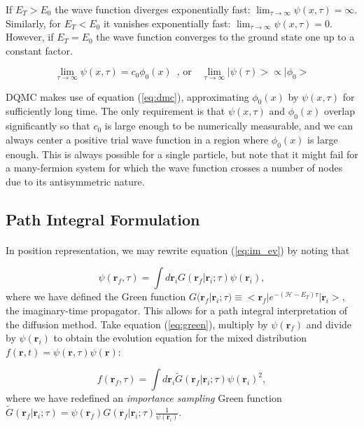 \documentclass[10pt, twocolumn, twoside]{article}
\begin{document}
If $E_T > E_0$ the wave function diverges exponentially fast: $\lim_{\tau \rightarrow \infty} \psi ( x, \tau) = \infty$. Similarly, for $E_T < E_0$ it vanishes exponentially fast: $
\lim_{\tau \rightarrow \infty} \psi ( x, \tau) = 0$. However, if $E_T = E_0$ the wave function converges to the ground state one up to a constant factor.

\begin{equation}\label{eq:dmc}
\lim_{\tau \rightarrow \infty} \psi ( x, \tau) = c_0 \phi_0 (x) \,\,\, \text{, or} \quad \lim_{\tau \rightarrow \infty} |\psi (\tau) > \propto | \phi_0 >
\end{equation}

DQMC makes use of equation (\ref{eq:dmc}), approximating $\phi_0(x)$ by $\psi (x, \tau)$ for sufficiently long time. The only requirement is that $\psi (x, \tau)$ and $\phi_0(x)$ overlap significantly so that $c_0$ is large enough to be numerically measurable, and we can always center a positive trial wave function in a region where $\phi_0(x)$ is large enough. This is always possible for a single particle,  but note that it might fail for a many-fermion system for which the wave function crosses a number of nodes due to its antisymmetric nature.\par

\subsection{Path Integral Formulation}\paragraph{}

In position representation, we may rewrite equation (\ref{eq:im_ev}) by noting that

\begin{equation}\label{eq:green}
\psi(\bm r_f, \tau) = \int d\bm r_i G( \bm r_f | \bm r_i ; \tau) \psi (\bm r_i) ,
\end{equation}
where we have defined the Green function $G( \bm r_f | \bm r_i ; \tau) \equiv < \bm r_f | e^{-(\mathcal{H} - E_T) \tau} | \bm r_i >$, the imaginary-time propagator. This allows for a path integral interpretation of the diffusion method. Take equation (\ref{eq:green}), multiply by $\psi (\bm r_f)$ and divide by $\psi (\bm r_i)$ to obtain the evolution equation for the mixed distribution $f(\bm r, t) = \psi (\bm r, \tau) \psi (\bm r)$:

\begin{equation}
f(\bm r_f, \tau) = \int d\bm r_i \tilde{G} ( \bm r_f | \bm r_i; \tau) \psi (\bm r_i)^2 ,
\end{equation}
where we have redefined an \emph{importance sampling} Green function $\tilde{G} (\bm r_f | \bm r_i; \tau) = \psi (\bm r_f) G(\bm r_f | \bm r_i ; \tau) \frac{1}{\psi(\bm r_i)}$. 
\end{document}
